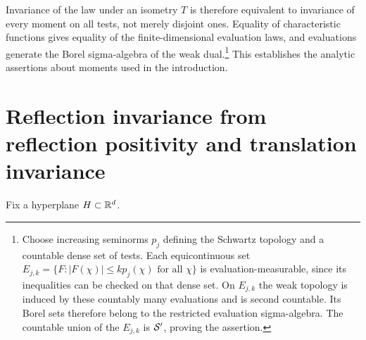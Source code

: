 Invariance of the law under an isometry $T$ is therefore equivalent
to invariance of every moment on all tests, not merely disjoint
ones. Equality of characteristic functions gives equality of the
finite-dimensional evaluation laws, and evaluations generate the
Borel sigma-algebra of the weak dual.\footnote{Choose increasing
seminorms $p_j$ defining the Schwartz topology and a countable dense
set of tests. Each equicontinuous set
$E_{j,k}=\{F:|F(\chi)|\leq kp_j(\chi)\text{ for all }\chi\}$ is
evaluation-measurable, since its inequalities can be checked on that
dense set. On $E_{j,k}$ the weak topology is induced by these countably
many evaluations and is second countable. Its Borel sets therefore
belong to the restricted evaluation sigma-algebra. The countable
union of the $E_{j,k}$ is $\mathcal{S}'$, proving the assertion.}
This establishes the analytic assertions about moments used in
the introduction.

\section{Reflection invariance from reflection positivity and translation invariance}

Fix a hyperplane $H\subset\mathbb{R}^d$.

